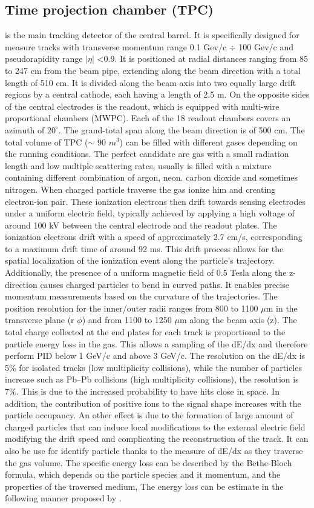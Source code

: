 \documentclass[12pt,a4paper]{book}
\begin{document}
	\subsection{Time projection chamber (TPC)}
	 is the main tracking detector of the central barrel. It is specifically designed for measure tracks with transverse momentum range 0.1 Gev/c $\div$ 100 Gev/c and pseudorapidity range $|\eta|$ <0.9.  It is positioned at radial distances ranging from 85 to 247 cm from the beam pipe, extending along the beam direction with a total length of 510 cm. It is divided along the beam axis into two equally large drift regions by a central cathode, each having a length of 2.5 m. On the opposite sides of the central electrodes is the readout, which is equipped with multi-wire proportional chambers (MWPC). Each of the 18 readout chambers covers an azimuth of $20^{\circ}$. The grand-total span along the beam direction is of 500 cm. The total volume of TPC ($\sim$ 90 $m^3$) can be filled with different gases depending on the running conditions. The perfect candidate are gas with a small radiation length and low multiple scattering rates, usually is filled with a mixture containing different combination of argon, neon. carbon dioxide and sometimes nitrogen. When charged particle traverse the gas ionize him and creating electron-ion pair. These ionization electrons then drift towards sensing electrodes under
	 a uniform electric field, typically achieved by applying a high voltage of around 100 kV between the central electrode and the readout plates. The ionization electrons drift with a speed of approximately 2.7 cm/s, corresponding to a maximum drift time of around 92 ms. This drift process allows for the spatial localization of the ionization event along the particle’s trajectory. Additionally, the presence of a uniform magnetic field of 0.5 Tesla along the z-direction causes charged particles to bend in curved paths. It
	 enables precise momentum measurements based on the curvature of the trajectories. 	 The position resolution for the inner/outer radii ranges from 800 to 1100 $\mu$m in the transverse plane (r $\phi$) and from 1100 to 1250 $\mu$m along the beam	axis (z). The total charge collected at the end plates for each track is proportional to the particle energy loss in the gas. This allows a sampling of the dE/dx and therefore perform	PID below 1 GeV/c and above 3 GeV/c. The resolution on the dE/dx is 5\% for isolated tracks (low multiplicity collisions), while the number of particles increase such as Pb–Pb collisions (high multiplicity collisions), the resolution is 7\%. This is due to the increased probability to have hits close in space. In addition, the contribution of positive ions to the signal shape increases with the particle occupancy. An other effect is due to the formation of large amount of charged particles that can induce local modifications to the external electric field modifying the drift speed and complicating the reconstruction of the track. It can also be use for identify particle thanks to the measure of dE/dx  as they traverse the gas volume. The specific energy loss can be described by the Bethe-Bloch formula, which depends on the particle species and it momentum, and the properties of the traversed medium, The energy loss can be estimate in the following manner proposed by \cite{Rolandi:2008ujz}.
\end{document}
